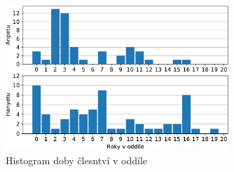 \begin{figure}[!ht]
  \begin{center}
    \includegraphics[width=0.75\textwidth]{statistika/hist_clen-crop.pdf}
  \end{center}
  \vspace*{-10pt}
  \caption{Histogram doby člesntví v oddíle}
  \label{fig:clen}
\end{figure}

\clearpage
